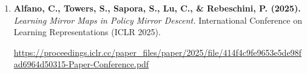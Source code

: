 \documentclass[11pt,a4paper]{article}
\begin{document}
\begin{enumerate}
    \url{https://proceedings.iclr.cc/paper_files/paper/2025/hash/1978afed95ab969e0c3bd9b159493d4b-Abstract-Conference.html}

    \item \textbf{Alfano, C., Towers, S., Sapora, S.,
    Lu, C., \& Rebeschini, P. (2025).}
    \textit{Learning Mirror Maps in Policy Mirror Descent.}
    International Conference on Learning Representations
    (ICLR 2025).

    \url{https://proceedings.iclr.cc/paper_files/paper/2025/file/414f4c9fe9653e5de98fad6964d50315-Paper-Conference.pdf}

\end{enumerate}
\end{document}
